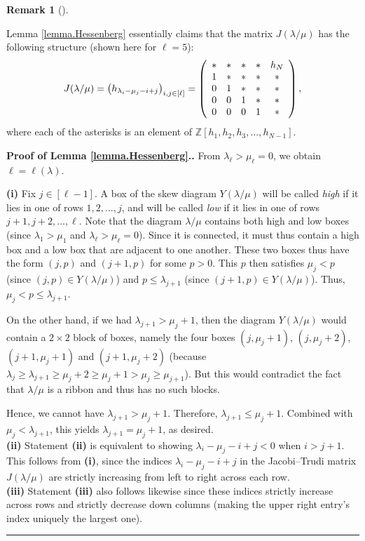 \documentclass[numbers=enddot,12pt,final,onecolumn,notitlepage]{scrartcl}%
\theoremstyle{definition}
\newtheorem{remk}[theo]{Remark}
\newenvironment{remark}[1][]
{\begin{remk}[#1]\begin{leftbar}}
{\end{leftbar}\end{remk}}
\newenvironment{proof}[1][Proof]{\noindent\textbf{#1.} }{\ \rule{0.5em}{0.5em}}
\renewcommand{\leq}{\leqslant}
\renewcommand{\geq}{\geqslant}
\theoremstyle{plainsl}
\begin{document}
\begin{remark}
Lemma \ref{lemma.Hessenberg} essentially claims that the matrix $J(\lambda / \mu)$ has the following structure (shown here for $\ell = 5$):
\[
J(\lambda / \mu) = \left(  h_{\lambda_{i}-\mu_{j}-i+j}\right)  _{i,j\in\left[  \ell\right]
}=\left(
\begin{array}
[c]{ccccc}%
\ast & \ast & \ast & \ast & h_{N}\\
1 & \ast & \ast & \ast & \ast\\
0 & 1 & \ast & \ast & \ast\\
0 & 0 & 1 & \ast & \ast\\
0 & 0 & 0 & 1 & \ast
\end{array}
\right),
\]
where each of the asterisks is an element of $\mathbb{Z}\left[  h_{1},h_{2},h_{3},\ldots, h_{N-1}\right]$.
\end{remark}

\begin{proof}[Proof of Lemma \ref{lemma.Hessenberg}.]
From $\lambda_\ell > \mu_\ell = 0$, we obtain $\ell=\ell\left(\lambda\right)$.

\textbf{(i)} Fix $j \in [\ell-1]$. A box of the skew diagram $Y(\lambda / \mu)$ will be called \emph{high} if it lies in one of rows $1, 2, \ldots, j$, and will be called \emph{low} if it lies in one of rows $j+1, j+2, \ldots, \ell$. Note that the diagram $\lambda / \mu$ contains both high and low boxes (since $\lambda_1> \mu_1$ and $\lambda_\ell > \mu_\ell = 0$). Since it is connected, it must thus contain a high box and a low box that are adjacent to one another. These two boxes thus have the form $(j, p)$ and $(j+1, p)$ for some $p > 0$. This $p$ then satisfies $\mu_j < p$ (since $(j, p) \in Y(\lambda / \mu)$) and $p \leq \lambda_{j+1}$ (since $(j+1, p)\in Y(\lambda / \mu)$). Thus, $\mu_j < p \leq \lambda_{j+1}$.

On the other hand, if we had $\lambda_{j+1}>\mu_{j}+1$, then the diagram $Y(\lambda / \mu)$ would contain a $2 \times 2$ block of boxes, namely the four boxes $(j, \mu_j + 1)$, $(j, \mu_j + 2)$, $(j+1, \mu_j + 1)$ and $(j+1, \mu_j + 2)$ (because $\lambda_j \geq \lambda_{j+1} \geq \mu_j + 2 \geq \mu_j + 1 > \mu_j \geq \mu_{j+1}$). But this would contradict the fact that $\lambda / \mu$ is a ribbon and thus has no such blocks.

Hence, we cannot have $\lambda_{j+1}>\mu_{j}+1$. Therefore, $\lambda_{j+1}\leq \mu_{j}+1$. Combined with $\mu_j < \lambda_{j+1}$, this yields $\lambda_{j+1}=\mu_{j}+1$, as desired.\\

\textbf{(ii)} Statement \textbf{(ii)} is equivalent to showing $\lambda_{i}-\mu_{j}-i+j < 0$ when $i > j+1$. This follows from \textbf{(i)}, since the indices $\lambda_{i}-\mu_{j}-i+j$ in the Jacobi--Trudi matrix $J(\lambda / \mu)$  are strictly increasing from left to right across each row.\\

\textbf{(iii)} Statement \textbf{(iii)} also follows likewise since these indices strictly increase across rows and strictly decrease down columns (making the upper right entry's index uniquely the largest one).
%
\end{proof}
\end{document}
